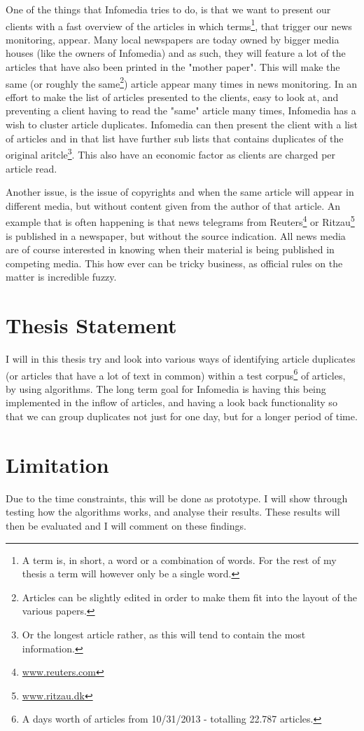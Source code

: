 One of the things that Infomedia tries to do, is that we want to present our clients with a fast overview of the articles in which terms\footnote{A term is, in short, a word or a combination of words. For the rest of my thesis a term will however only be a single word.}, that trigger our news monitoring, appear. Many local newspapers are today owned by bigger media houses (like the owners of Infomedia) and as such, they will feature a lot of the articles that have also been printed in the "mother paper". This will make the same (or roughly the same\footnote{Articles can be slightly edited in order to make them fit into the layout of the various papers.}) article appear many times in news monitoring. In an effort to make the list of articles presented to the clients, easy to look at, and preventing a client having to read the "same" article many times, Infomedia has a wish to cluster article duplicates. Infomedia can then present the client with a list of articles and in that list have further sub lists that contains duplicates of the original aritcle\footnote{Or the longest article rather, as this will tend to contain the most information.}. This also have an economic factor as clients are charged per article read.

Another issue, is the issue of copyrights and when the same article will appear in different media, but without content given from the author of that article. An example that is often happening is that news telegrams from Reuters\footnote{\url{www.reuters.com}} or Ritzau\footnote{\url{www.ritzau.dk}} is published in a newspaper, but without the source indication. All news media are of course interested in knowing when their material is being published in competing media. This how ever can be tricky business, as official rules on the matter is incredible fuzzy.

\section{Thesis Statement}

I will in this thesis try and look into various ways of identifying article duplicates (or articles that have a lot of text in common) within a test corpus\footnote{A days worth of articles from 10/31/2013 - totalling 22.787 articles.} of articles, by using algorithms. The long term goal for Infomedia is having this being implemented in the inflow of articles, and having a look back functionality so that we can group duplicates not just for one day, but for a longer period of time.

\section{Limitation}
Due to the time constraints, this will be done as prototype. I will show through testing how the algorithms works, and analyse their results. These results will then be evaluated and I will comment on these findings.